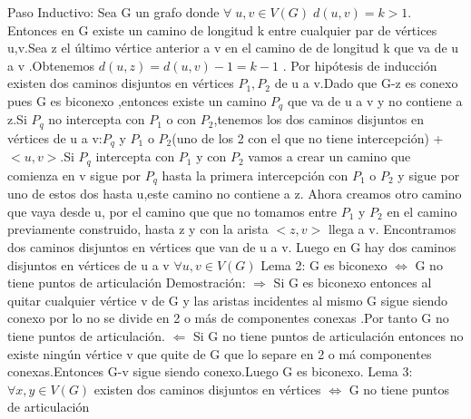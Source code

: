\documentclass{article}
\begin{document}
    Paso Inductivo:\newline
    Sea G un grafo donde $\forall\; u,v\in V(G)\; d(u,v)=k>1$. Entonces en G existe un camino de longitud k entre 
    cualquier par de v\'ertices u,v.Sea z el \'ultimo v\'ertice anterior a v en el camino de de longitud k que va de
    u a v .Obtenemos $d(u,z)=d(u,v)-1=k-1$ . Por hip\'otesis de inducci\'on existen dos caminos disjuntos en v\'ertices 
    $P_{1},P_{2}$ de u a v.Dado que G-z es conexo pues G es biconexo ,entonces existe un camino $P_{q}$ que va de u a v
    y no contiene a z.Si $P_{q}$ no intercepta con $P_{1}$ o con $P_{2}$,tenemos los dos caminos disjuntos en v\'ertices
    de u a v:$P_{q}$ y $P_{1}$ o $P_{2}$(uno de los 2 con el que no tiene intercepci\'on) + $<u,v>$.Si $P_{q}$ intercepta 
    con $P_{1}$ y con $P_{2}$ vamos a crear un camino que comienza en v sigue por $P_{q}$ hasta la primera intercepci\'on con
    $P_{1}$ o $P_{2}$ y sigue por uno de estos dos hasta u,este camino no contiene a z. Ahora creamos  otro camino que vaya 
    desde u, por el camino que que no tomamos entre $P_{1}$ y $P_{2}$ en el camino previamente construido,  hasta z y con la arista $<z,v>$ llega 
    a v. Encontramos dos caminos disjuntos en v\'ertices que van de u a v.\newline
    Luego en G hay dos caminos disjuntos en v\'ertices de u a v $\forall u,v \in V(G)$
    \newline
    \newline
    Lema 2:\newline
    G es biconexo $\Longleftrightarrow$ G no tiene puntos de articulaci\'on \newline
    Demostraci\'on:\newline
    $\Longrightarrow$\newline
    Si G es biconexo entonces al quitar cualquier v\'ertice v de G y las aristas incidentes al mismo 
    G sigue siendo conexo por lo no se divide en 2 o m\'as de componentes conexas .Por tanto G no
    tiene puntos de articulaci\'on.\newline
    $\Longleftarrow$\newline
    Si G no tiene puntos de articulaci\'on entonces no existe ning\'un  v\'ertice v que quite de G que lo separe en
    2 o m\'a  componentes conexas.Entonces G-v sigue siendo conexo.Luego G es biconexo.
    \newline
    \newline
    Lema 3:\newline
    $\forall x,y\in V(G)$ existen dos caminos disjuntos en v\'ertices $\Longleftrightarrow$ G no tiene puntos de articulaci\'on\newline
\end{document}
